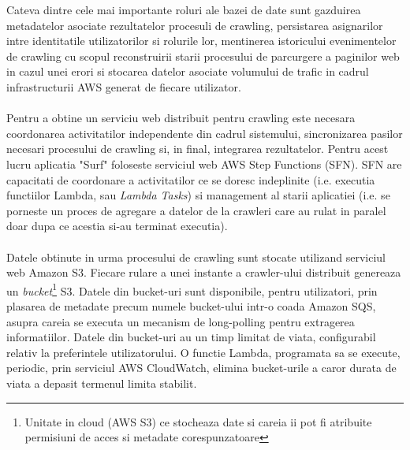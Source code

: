 \noindent
Cateva dintre cele mai importante roluri ale bazei de date sunt gazduirea metadatelor asociate rezultatelor procesuli de crawling, persistarea asignarilor intre identitatile utilizatorilor si rolurile lor, mentinerea istoricului evenimentelor de crawling cu scopul reconstruirii starii procesului de parcurgere a paginilor web in cazul unei erori si stocarea datelor asociate volumului de trafic in cadrul infrastructurii AWS generat de fiecare utilizator.
\\
\\
Pentru a obtine un serviciu web distribuit pentru crawling este necesara coordonarea activitatilor independente din cadrul sistemului, sincronizarea pasilor necesari procesului de crawling si, in final, integrarea rezultatelor. Pentru acest lucru aplicatia "Surf" foloseste serviciul web AWS Step Functions (SFN). SFN  are capacitati de coordonare a activitatilor ce se doresc indeplinite (i.e. executia functiilor Lambda, sau \emph{Lambda Tasks}) si management al starii aplicatiei (i.e. se porneste un proces de agregare a datelor de la crawleri care au rulat in paralel doar dupa ce acestia si-au terminat executia).
\\
\\
Datele obtinute in urma procesului de crawling sunt stocate utilizand serviciul web Amazon S3. Fiecare rulare a unei instante a crawler-ului distribuit genereaza un \emph{bucket}\footnote{Unitate in cloud (AWS S3) ce stocheaza date si careia ii pot fi atribuite permisiuni de acces si metadate corespunzatoare} S3. Datele din bucket-uri sunt disponibile, pentru utilizatori, prin plasarea de metadate precum numele bucket-ului intr-o coada Amazon SQS, asupra careia se executa un mecanism de long-polling pentru extragerea informatiilor. Datele din bucket-uri au un timp limitat de viata, configurabil relativ la preferintele utilizatorului.   O functie Lambda, programata sa se execute, periodic, prin serviciul AWS CloudWatch, elimina bucket-urile a caror durata de viata a depasit termenul limita stabilit.

